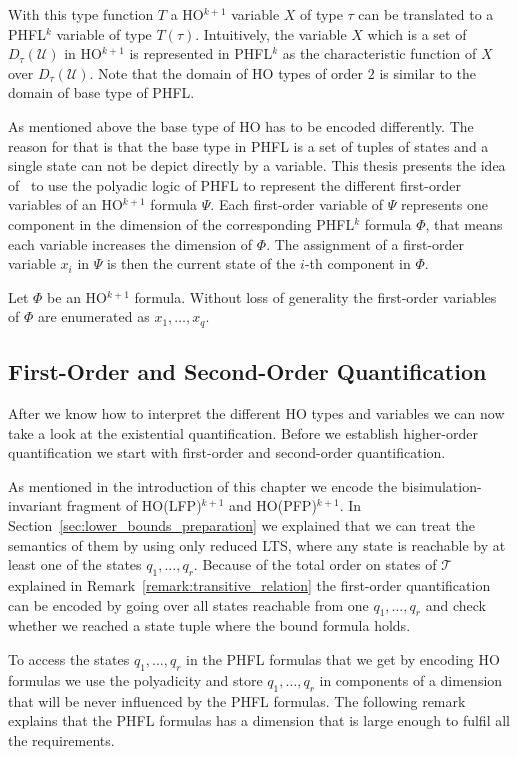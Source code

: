 With this type function $T$ a HO$^{k + 1}$ variable $X$ of type $\tau$ can be translated to a PHFL$^k$ variable
of type $T(\tau)$. Intuitively, the variable $X$ which is a set of $D_\tau(\mathcal{U})$ in HO$^{k+1}$ is represented
in PHFL$^k$ as the characteristic function of $X$ over $D_\tau(\mathcal{U})$. Note that the domain of HO types
of order $2$ is similar to the domain of base type of PHFL.

As mentioned above the base type of HO has to be encoded differently. The reason for that is that the base type in PHFL is a
set of tuples of states and a single state can not be depict directly by a variable. This thesis presents the
idea of~\cite{lange2014capturing} to use the polyadic logic of PHFL to represent the different first-order variables of an HO$^{k+1}$ formula
$\Psi$. Each first-order variable of $\Psi$ represents one component in the dimension of the 
corresponding PHFL$^k$ formula $\Phi$, that
means each variable increases the dimension of $\Phi$. The assignment of a first-order 
variable $x_i$ in $\Psi$ is then the current state of the $i$-th component in $\Phi$.

Let $\Phi$ be an HO$^{k+1}$ formula. Without loss of generality the first-order variables of $\Phi$ are enumerated as
$x_1, \dots, x_q$.

\subsection{First-Order and Second-Order Quantification}\label{subsec:existentialQuantifiers}

After we know how to interpret the different HO types and variables we can now take a look at the existential quantification. Before we establish higher-order quantification we start with first-order and second-order quantification.

As mentioned in the introduction of this chapter we encode the bisimula\-tion-invariant fragment of HO(LFP)$^{k + 1}$ and HO(PFP)$^{k+1}$. In Section~\ref{sec:lower_bounds_preparation}  we explained that we can treat the semantics of them by using only reduced LTS, where any state is reachable by at least one of the states $q_1, \dots, q_r$. Because of the total order on states of $\mathcal{T}$ explained in Remark~\ref{remark:transitive_relation} the first-order
quantification can be encoded by going over all states reachable from one $q_1, \dots, q_r$ and check whether we
reached a state tuple where the bound formula holds.

To access the states $q_1, \dots, q_r$ in the PHFL formulas that we get by encoding HO 
formulas we use the polyadicity and store $q_1, \dots, q_r$ in components of a dimension that 
will be never influenced by the PHFL formulas. The following remark explains that the PHFL 
formulas has a dimension that is large enough to fulfil all the requirements. 

